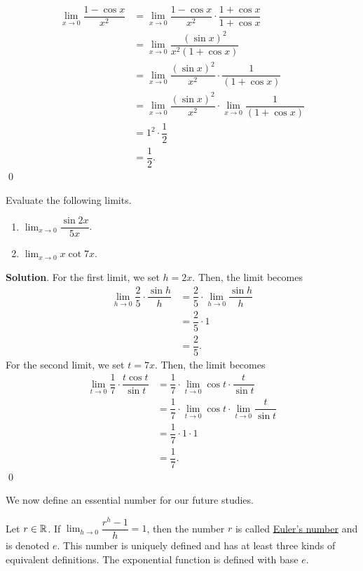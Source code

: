 \documentclass[11pt]{book}
\begin{document}
\begin{align*}
    \lim_{x\to 0}\dfrac{1-\cos x}{x^2}&=\lim_{x\to 0}\dfrac{1-\cos x}{x^2}\cdot\dfrac{1+\cos x}{1+\cos x}\\
    &=\lim_{x\to 0}\dfrac{(\sin x)^2}{x^2(1+\cos x)}\\
    &=\lim_{x\to 0}\dfrac{(\sin x)^2}{x^2}\cdot\dfrac{1}{(1+\cos x)}\\
    &=\lim_{x\to 0}\dfrac{(\sin x)^2}{x^2}\cdot\lim_{x\to 0}\dfrac{1}{(1+\cos x)}\\
    &=1^2\cdot\dfrac{1}{2}\\
    &=\dfrac{1}{2}.
\end{align*} \qed

\begin{example}
    Evaluate the following limits.
    \begin{enumerate}
        \item $\displaystyle\lim_{x\to 0}\dfrac{\sin 2x}{5x}$.
        \item $\displaystyle\lim_{x\to 0}x\cot7x$.
    \end{enumerate}
\end{example}
\textbf{Solution}. For the first limit, we set $h=2x$. Then, the limit becomes \begin{align*}
    \lim_{h\to 0}\dfrac{2}{5}\cdot\dfrac{\sin h}{h}&=\dfrac{2}{5}\cdot\lim_{h\to 0}\dfrac{\sin h}{h}\\
    &=\dfrac{2}{5}\cdot1\\
    &=\dfrac{2}{5}.
\end{align*} For the second limit, we set $t=7x$. Then, the limit becomes \begin{align*}
    \lim_{t\to 0}\dfrac{1}{7}\cdot\dfrac{t\cos t}{\sin t}&=\dfrac{1}{7}\cdot\lim_{t\to 0}\cos t\cdot\dfrac{t}{\sin t}\\
    &=\dfrac{1}{7}\cdot\lim_{t\to 0}\cos t\cdot\lim_{t\to 0}\dfrac{t}{\sin t}\\
    &=\dfrac{1}{7}\cdot1\cdot1\\
    &=\dfrac{1}{7}.
\end{align*} \qed

We now define an essential number for our future studies.

\begin{definition}
    Let $r\in\mathbb{R}$. If $\displaystyle\lim_{h\to 0}\dfrac{r^h-1}{h}=1$, then the number $r$ is called \underline{Euler's number} and is denoted $e$. This number is uniquely defined and has at least three kinds of equivalent definitions. The exponential function is defined with base $e$.
\end{definition}
\end{document}
